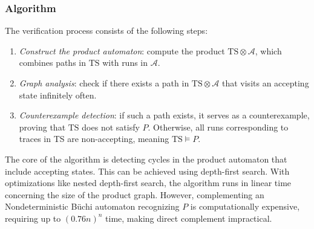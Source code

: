 \subsubsection{Algorithm}
The verification process consists of the following steps:
\begin{enumerate}
    \item \textit{Construct the product automaton}: compute the product $\text{TS} \otimes \mathcal{A}$, which combines paths in $\text{TS}$ with runs in $\mathcal{A}$.
    \item \textit{Graph analysis}: check if there exists a path in $\text{TS} \otimes \mathcal{A}$ that visits an accepting state infinitely often.
    \item \textit{Counterexample detection}: if such a path exists, it serves as a counterexample, proving that $\text{TS}$ does not satisfy $P$.
        Otherwise, all runs corresponding to traces in TS are non-accepting, meaning $\text{TS}\models P$.
\end{enumerate}
\noindent The core of the algorithm is detecting cycles in the product automaton that include accepting states. 
This can be achieved using depth-first search.
With optimizations like nested depth-first search, the algorithm runs in linear time concerning the size of the product graph.
However, complementing an Nondeterministic Büchi automaton recognizing $P$ is computationally expensive, requiring up to $(0.76n)^n$ time, making direct complement impractical.